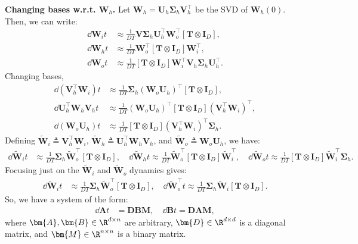 \documentclass{article}
\begin{document}
\textbf{Changing bases w.r.t. $\bm{W}_h$.}
Let $\bm{W}_h = \bm{U}_h \bm{\Sigma}_h \bm{V}_h^\top$ be the SVD of $\bm{W}_h(0)$.
Then, we can write:
\begin{align*}
    \dd{\bm{W}_i}{t} &\approx \frac{1}{DT} \bm{V} \bm{\Sigma}_h \bm{U}_h^\top \bm{W}_{o}^\top \left[ \bm{T} \otimes \bm{I}_D \right], \\
    \dd{\bm{W}_h}{t} &\approx \frac{1}{DT} \bm{W}_{o}^\top \left[ \bm{T} \otimes \bm{I}_D \right] \bm{W}_{i}^\top, \\
    \dd{\bm{W}_o}{t} &\approx \frac{1}{DT} \left[ \bm{T} \otimes \bm{I}_D \right] \bm{W}_{i}^\top \bm{V}_h \bm{\Sigma}_h \bm{U}_h^\top.
\end{align*}
Changing bases,
\begin{align*}
    \dd{(\bm{V}_h^\top \bm{W}_i)}{t} &\approx \frac{1}{DT} \bm{\Sigma}_h (\bm{W}_{o} \bm{U}_h)^\top \left[ \bm{T} \otimes \bm{I}_D \right], \\
    \dd{\bm{U}_h^\top \bm{W}_h \bm{V}_h}{t} &\approx \frac{1}{DT} (\bm{W}_{o} \bm{U}_h)^\top \left[ \bm{T} \otimes \bm{I}_D \right] (\bm{V}_h^\top \bm{W}_{i})^\top, \\
    \dd{(\bm{W}_o \bm{U}_h)}{t} &\approx \frac{1}{DT} \left[ \bm{T} \otimes \bm{I}_D \right] (\bm{V}_h^\top \bm{W}_{i})^\top \bm{\Sigma}_h.
\end{align*}
Defining $\tilde{\bm{W}}_i \triangleq \bm{V}_h^\top \bm{W}_i$, $\tilde{\bm{W}}_h \triangleq \bm{U}_h^\top \bm{W}_h \bm{V}_h$, and $\tilde{\bm{W}}_o \triangleq \bm{W}_o \bm{U}_h$, we have:
\begin{align*}
    \dd{\tilde{\bm{W}}_i}{t} &\approx \frac{1}{DT} \bm{\Sigma}_h \tilde{\bm{W}}_o^\top \left[ \bm{T} \otimes \bm{I}_D \right], \quad
    \dd{\tilde{\bm{W}}_h}{t} \approx \frac{1}{DT} \tilde{\bm{W}}_o^\top \left[ \bm{T} \otimes \bm{I}_D \right] \tilde{\bm{W}}_i^\top, \quad
    \dd{\tilde{\bm{W}}_o}{t} \approx \frac{1}{DT} \left[ \bm{T} \otimes \bm{I}_D \right] \tilde{\bm{W}}_i^\top \bm{\Sigma}_h.
\end{align*}
Focusing just on the $\tilde{\bm{W}}_i$ and $\tilde{\bm{W}}_o$ dynamics gives:
\begin{align*}
    \dd{\tilde{\bm{W}}_i}{t} &\approx \frac{1}{DT} \bm{\Sigma}_h \tilde{\bm{W}}_o^\top \left[ \bm{T} \otimes \bm{I}_D \right], \quad
    \dd{\tilde{\bm{W}}_o^\top}{t} \approx \frac{1}{DT} \bm{\Sigma}_h \tilde{\bm{W}}_i \left[ \bm{T} \otimes \bm{I}_D \right].
\end{align*}
So, we have a system of the form:
\begin{align*}
    \dd{\bm{A}}{t} &= \bm{D} \bm{B} \bm{M}, \quad
    \dd{\bm{B}}{t} = \bm{D} \bm{A} \bm{M},
\end{align*}
where $\bm{A}, \bm{B} \in \R^{d \times n}$ are arbitrary, $\bm{D} \in \R^{d \times d}$ is a diagonal matrix, and $\bm{M} \in \R^{n \times n}$ is a binary matrix.
\end{document}

